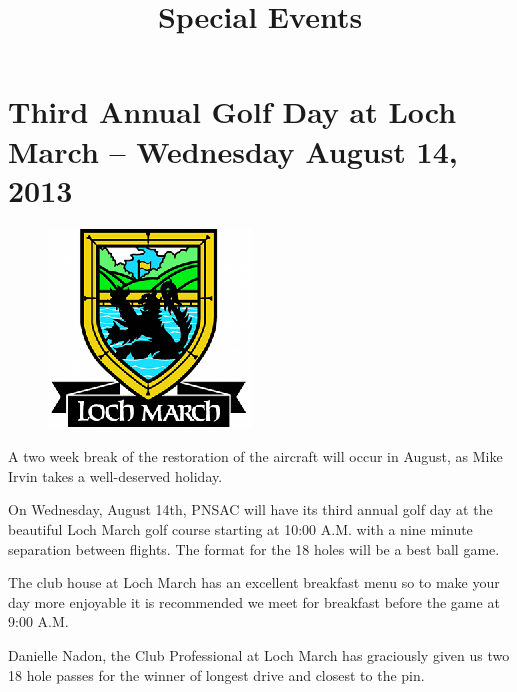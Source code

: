 



\title{Special Events}

\maketitle

\section{Third Annual Golf Day at Loch March -- Wednesday August 14, 2013}
\label{sec:golf}

\begin{figure}[htbp]
   \vspace{2em}
   \centering
   \includegraphics[scale=1.5]{loch_march.eps}
   \label{fig:logo}
\end{figure}
 
A two week break of the restoration of the aircraft will occur in
August, as Mike Irvin takes a well-deserved holiday.
 
On Wednesday, August 14th, PNSAC will have its third annual golf day
at the beautiful Loch March golf course starting at 10:00 A.M. with a
nine minute separation between flights.  The format for the 18 holes
will be a best ball game.
 
The club house at Loch March has an excellent breakfast menu so to
make your day more enjoyable it is recommended we meet for breakfast
before the game at 9:00 A.M.
 
Danielle Nadon, the Club Professional at Loch March has graciously
given us two 18 hole passes for the winner of longest drive and
closest to the pin.
 
